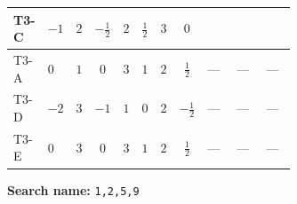 \documentclass[8pt]{article}
\begin{document}
\begin{landscape}
\begin{longtable}{@{}llcccccc >{\raggedright\arraybackslash}p{0.21\linewidth} >{\raggedright\arraybackslash}p{0.21\linewidth} >{\raggedright\arraybackslash}p{0.21\linewidth}@{}}
T3-C & $-1$ & $2$ & $-\frac{1}{2}$ & $2$ & $\frac{1}{2}$ & $3$ & $0$ & \scriptsize\adjustbox{max width=\linewidth}{$\begin{gathered} - \frac{lambda12Inv2 \overline{y_{1}} \overline{y_{2}}}{6 MF}\end{gathered}$} & \scriptsize\adjustbox{max width=\linewidth}{$\begin{gathered} - \frac{\sqrt{3} g_{2}^{2} \overline{y_{1}} \overline{y_{2}}}{8 MF}\end{gathered}$} & \scriptsize\adjustbox{max width=\linewidth}{$\begin{gathered} \frac{\sqrt{3} ye \overline{y_{1}} \overline{y_{2}} \overline{ye}}{24 MF}\end{gathered}$} \\
\midrule
T3-A & $0$ & $1$ & $0$ & $3$ & $1$ & $2$ & $\frac{1}{2}$ & --- & --- & --- \\
\midrule
T3-D & $-2$ & $3$ & $-1$ & $1$ & $0$ & $2$ & $-\frac{1}{2}$ & --- & --- & --- \\
\midrule
T3-E & $0$ & $3$ & $0$ & $3$ & $1$ & $2$ & $\frac{1}{2}$ & --- & --- & --- \\
\midrule
\bottomrule
\end{longtable}
\clearpage
\noindent\textbf{Search name: }\texttt{1,2,5,9}\par\smallskip

\end{landscape}
\end{document}
